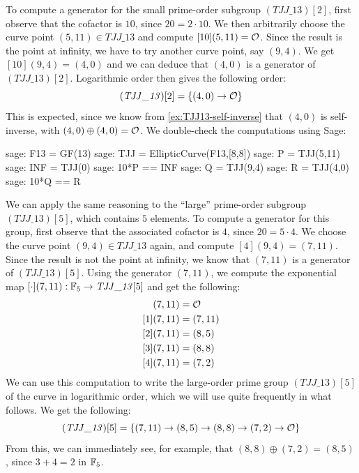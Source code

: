 \begin{example}
To compute a generator for the small prime-order subgroup $(\mathit{TJJ\_13})[2]$, first observe that the cofactor is $10$, since $20=2\cdot 10$. We then arbitrarily choose the curve point $(5,11)\in \mathit{TJJ\_13}$ and compute $[10](5,11)=\mathcal{O}$. Since the result is the point at infinity, we have to try another curve point, say $(9,4)$. We get $[10](9,4)=(4,0)$ and we can deduce that $(4,0)$ is a generator of $(\mathit{TJJ\_13})[2]$. Logarithmic order then gives the following order:
\begin{equation}
(\mathit{TJJ\_13})[2] = \{(4,0)\to \mathcal{O}\}
\end{equation}
This is expected, since we know from \examplename{} \ref{ex:TJJ13-self-inverse} that $(4,0)$ is self-inverse, with $(4,0)\oplus (4,0)=\mathcal{O}$. We double-check the computations using Sage: 
\begin{sagecommandline}
sage: F13 = GF(13)
sage: TJJ = EllipticCurve(F13,[8,8])
sage: P = TJJ(5,11)
sage: INF = TJJ(0)
sage: 10*P == INF
sage: Q = TJJ(9,4)
sage: R = TJJ(4,0)
sage: 10*Q == R
\end{sagecommandline}
We can apply the same reasoning to the ``large'' prime-order subgroup $(\mathit{TJJ\_13})[5]$, which contains $5$ elements. To compute a generator for this group, first observe that the associated cofactor is $4$, since $20=5\cdot 4$. We choose the curve point $(9,4)\in \mathit{TJJ\_13}$ again, and compute $[4](9,4)=(7,11)$. Since the result is not the point at infinity, we know that $(7,11)$ is a generator of $(\mathit{TJJ\_13})[5]$. Using the generator $(7,11)$, we compute the exponential map $[\cdot](7,11): \mathbb{F}_5 \to \mathit{TJJ\_13}[5]$ and get the following:
\begin{align*}
[0](7,11) &= \Oinf\\
[1](7,11) &= (7,11)\\
[2](7,11) &= (8,5)\\
[3](7,11) &= (8,8)\\
[4](7,11) &= (7,2)
\end{align*}
We can use this computation to write the large-order prime group $(\mathit{TJJ\_13})[5]$ of the  curve in logarithmic order, which we will use quite frequently in what follows. We get the following:
\begin{equation}\label{eq:TJJ13-logarithmic-order}
(\mathit{TJJ\_13})[5] = \{(7,11)\to(8,5)\to(8,8)\to(7,2)\to \mathcal{O}\}
\end{equation}
From this, we can immediately see, for example, that  $(8,8)\oplus (7,2)= (8,5)$, since 
$3+4=2$ in $\mathbb{F}_5$.
\end{example}
